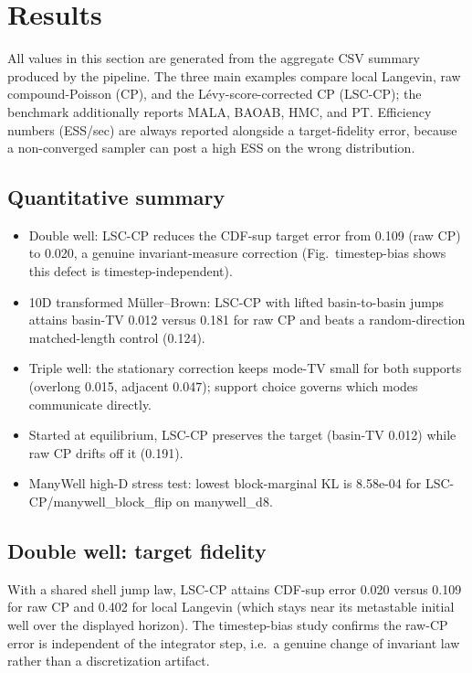 \section{Results}

All values in this section are generated from the aggregate CSV summary produced by the pipeline. The three main examples compare local Langevin, raw compound-Poisson (CP), and the L\'evy-score-corrected CP (LSC-CP); the benchmark additionally reports MALA, BAOAB, HMC, and PT. Efficiency numbers (ESS/sec) are always reported alongside a target-fidelity error, because a non-converged sampler can post a high ESS on the wrong distribution.

\subsection{Quantitative summary}

\begin{itemize}
\item Double well: LSC-CP reduces the CDF-sup target error from 0.109 (raw CP) to 0.020, a genuine invariant-measure correction (Fig.~timestep-bias shows this defect is timestep-independent).
\item 10D transformed M\"uller--Brown: LSC-CP with lifted basin-to-basin jumps attains basin-TV 0.012 versus 0.181 for raw CP and beats a random-direction matched-length control (0.124).
\item Triple well: the stationary correction keeps mode-TV small for both supports (overlong 0.015, adjacent 0.047); support choice governs which modes communicate directly.
\item Started at equilibrium, LSC-CP preserves the target (basin-TV 0.012) while raw CP drifts off it (0.191).
\item ManyWell high-D stress test: lowest block-marginal KL is 8.58e-04 for LSC-CP/manywell\_block\_flip on manywell\_d8.
\end{itemize}


\subsection{Double well: target fidelity}With a shared shell jump law, LSC-CP attains CDF-sup error 0.020 versus 0.109 for raw CP and 0.402 for local Langevin (which stays near its metastable initial well over the displayed horizon). The timestep-bias study confirms the raw-CP error is independent of the integrator step, i.e.\ a genuine change of invariant law rather than a discretization artifact.

